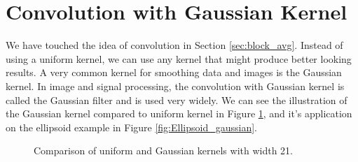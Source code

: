 \documentclass[a4paper,10pt]{report}
\begin{document}
\section{Convolution with Gaussian Kernel}\label{sec:gaussian_kernel}

We have touched the idea of convolution in Section \ref{sec:block_avg}. Instead of using a uniform kernel, we can use any kernel that might produce better looking results. A very common kernel for smoothing data and images is the Gaussian kernel. In image and signal processing, the convolution with Gaussian kernel is called the Gaussian filter and is used very widely. We can see the illustration of the Gaussian kernel compared to uniform kernel in Figure \ref{fig:kernel_comparison}, and it's application on the ellipsoid example in Figure \ref{fig:Ellipsoid_gaussian}.
\begin{figure}[H]
    \centering
    
    \caption{Comparison of uniform and Gaussian kernels with width 21.}
    \label{fig:kernel_comparison}
\end{figure}
\end{document}
